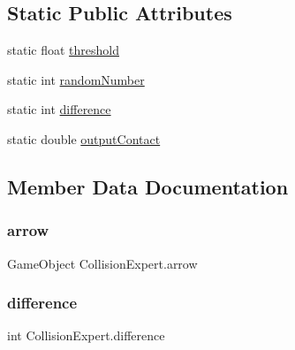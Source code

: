 \subsection*{Static Public Attributes}
\begin{DoxyCompactItemize}
\item 
static float \hyperlink{classCollisionExpert_a4a09ac0b83e42a4b51663b75fbc260fd}{threshold}
\item 
static int \hyperlink{classCollisionExpert_a115c2040e284bc202f46f0fc33fa9e32}{random\+Number}
\item 
static int \hyperlink{classCollisionExpert_ad8b7911d28c24cd1bcd8acf225db60b9}{difference}
\item 
static double \hyperlink{classCollisionExpert_abaee31831591794eb53dd67075246e69}{output\+Contact}
\end{DoxyCompactItemize}


\subsection{Member Data Documentation}
\mbox{\label{classCollisionExpert_ae302e5919a07024b5fc81ca6d50a0af4}} 
\subsubsection{\texorpdfstring{arrow}{arrow}}
{\footnotesize\ttfamily Game\+Object Collision\+Expert.\+arrow}

\mbox{\label{classCollisionExpert_ad8b7911d28c24cd1bcd8acf225db60b9}} 
\subsubsection{\texorpdfstring{difference}{difference}}
{\footnotesize\ttfamily int Collision\+Expert.\+difference\hspace{0.3cm}{\ttfamily [static]}}

\mbox{\label{classCollisionExpert_ada8a7f3badca3ef8f4cea6ed93a85027}} 
